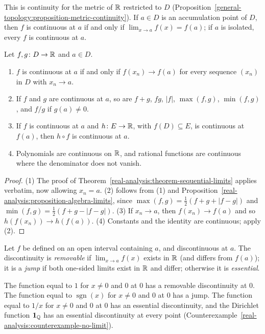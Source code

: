 This is continuity for the metric of $\mathbb{R}$ restricted to $D$ (Proposition~\ref{general-topology:proposition-metric-continuity}). If $a \in D$ is an accumulation point of $D$, then $f$ is continuous at $a$ if and
only if $\lim_{x \to a}f(x) = f(a)$; if $a$ is isolated, every $f$ is continuous at $a$.

\begin{proposition}\label{real-analysis:proposition-continuity-sequential}
Let $f, g \colon D \to \mathbb{R}$ and $a \in D$.
\begin{enumerate}
\item $f$ is continuous at $a$ if and only if $f(x_n) \to f(a)$ for every sequence $(x_n)$ in $D$ with $x_n \to a$.
\item If $f$ and $g$ are continuous at $a$, so are $f + g$, $fg$, $|f|$, $\max(f, g)$, $\min(f, g)$, and $f/g$ if $g(a) \neq 0$.
\item If $f$ is continuous at $a$ and $h \colon E \to \mathbb{R}$, with $f(D) \subseteq E$, is continuous at $f(a)$, then $h \circ f$ is continuous at $a$.
\item Polynomials are continuous on $\mathbb{R}$, and rational functions are continuous where the denominator does not vanish.
\end{enumerate}
\end{proposition}

\begin{proof}
(1) The proof of Theorem~\ref{real-analysis:theorem-sequential-limits} applies verbatim, now allowing $x_n = a$. (2) follows from (1) and Proposition~\ref{real-analysis:proposition-algebra-limits}, since
$\max(f, g) = \frac12(f + g + |f - g|)$ and $\min(f, g) = \frac12(f + g - |f - g|)$. (3) If $x_n \to a$, then $f(x_n) \to f(a)$ and so $h(f(x_n)) \to h(f(a))$. (4) Constants and the identity are continuous;
apply (2).
\end{proof}

\begin{definition}\label{real-analysis:definition-discontinuities}
Let $f$ be defined on an open interval containing $a$, and discontinuous at $a$. The discontinuity is \emph{removable} if $\lim_{x \to a}f(x)$ exists in $\mathbb{R}$ (and differs from $f(a)$); it is a \emph{jump} if both
one-sided limits exist in $\mathbb{R}$ and differ; otherwise it is \emph{essential}.
\end{definition}

\begin{example}\label{real-analysis:example-discontinuities}
The function equal to $1$ for $x \neq 0$ and $0$ at $0$ has a removable discontinuity at $0$. The function equal to $\operatorname{sgn}(x)$ for $x \neq 0$ and $0$ at $0$ has a jump. The function equal to $1/x$ for
$x \neq 0$ and $0$ at $0$ has an essential discontinuity, and the Dirichlet function $\mathbf{1}_{\mathbb{Q}}$ has an essential discontinuity at every point (Counterexample~\ref{real-analysis:counterexample-no-limit}).
\end{example}

